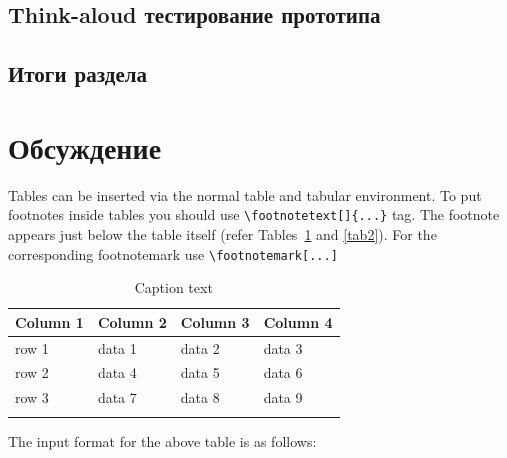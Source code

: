 \documentclass[pdflatex,sn-mathphys-num]{sn-jnl}%
\theoremstyle{thmstyleone}%
\theoremstyle{thmstyletwo}%
\theoremstyle{thmstylethree}%
\begin{document}
\subsection{Think-aloud тестирование прототипа}

\subsection{Итоги раздела}

\section{Обсуждение}\label{Discussion}

Tables can be inserted via the normal table and tabular environment. To put
footnotes inside tables you should use \verb+\footnotetext[]{...}+ tag.
The footnote appears just below the table itself (refer Tables~\ref{tab1} and \ref{tab2}). 
For the corresponding footnotemark use \verb+\footnotemark[...]+

\begin{table}[h]
\caption{Caption text}\label{tab1}%
\begin{tabular}{@{}llll@{}}
\toprule
Column 1 & Column 2  & Column 3 & Column 4\\
\midrule
row 1    & data 1   & data 2  & data 3  \\
row 2    & data 4   & data 5\footnotemark[1]  & data 6  \\
row 3    & data 7   & data 8  & data 9\footnotemark[2]  \\
\botrule
\end{tabular}
\end{table}

\noindent
The input format for the above table is as follows:
\end{document}
